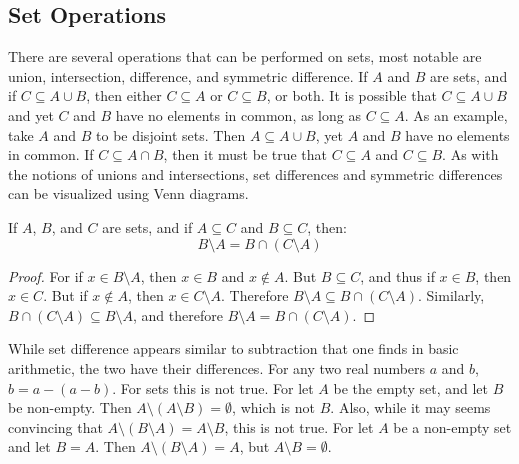     \subsection{Set Operations}
        There are several operations that can be performed on sets,
        most notable are union, intersection, difference, and symmetric
        difference.
        If $A$ and $B$ are sets, and if $C\subseteq{A}\cup{B}$, then
        either $C\subseteq{A}$ or $C\subseteq{B}$, or both. It is
        possible that $C\subseteq{A}\cup{B}$ and yet $C$ and $B$ have no
        elements in common, as long as $C\subseteq{A}$. As an example,
        take $A$ and $B$ to be disjoint sets. Then $A\subseteq{A}\cup{B}$,
        yet $A$ and $B$ have no elements in common. If
        $C\subseteq{A}\cap{B}$, then it must be true that
        $C\subseteq{A}$ and $C\subseteq{B}$.
        As with the notions of unions and intersections, set differences and
        symmetric differences can be visualized using Venn diagrams.
        \begin{theorem}
            \label{thm:MEASURE_THEORY_SET_DIFFERENCE_AS_INTERSECTION}
            If $A$, $B$, and $C$ are sets, and if $A\subseteq{C}$
            and $B\subseteq{C}$, then:
            \begin{equation}
                B\setminus{A}=B\cap(C\setminus{A})
            \end{equation}
        \end{theorem}
        \begin{proof}
            For if $x\in{B}\setminus{A}$, then
            $x\in{B}$ and $x\notin{A}$. But
            $B\subseteq{C}$, and thus if $x\in{B}$, then $x\in{C}$.
            But if $x\notin{A}$, then $x\in{C}\setminus{A}$. Therefore
            $B\setminus{A}\subseteq{B}\cap(C\setminus{A})$.
            Similarly, $B\cap(C\setminus{A})\subseteq{B}\setminus{A}$,
            and therefore $B\setminus{A}={B}\cap(C\setminus{A})$.
        \end{proof}
        While set difference appears similar to subtraction that one finds in
        basic arithmetic, the two have their differences. For any two real
        numbers $a$ and $b$, $b=a-(a-b)$. For sets this is not true. For let
        $A$ be the empty set, and let $B$ be non-empty. Then
        $A\setminus(A\setminus{B})=\emptyset$, which is not $B$.
        Also, while it may seems convincing that
        $A\setminus(B\setminus{A})=A\setminus{B}$, this is not true. For
        let $A$ be a non-empty set and let $B=A$. Then
        $A\setminus(B\setminus{A})=A$, but $A\setminus{B}=\emptyset$.
